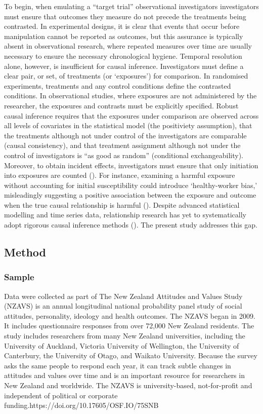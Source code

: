 \documentclass[
  singlecolumn]{article}
\begin{document}
To begin, when emulating a ``target trial'' observational investigators
investigators must ensure that outcomes they measure do not precede the
treatments being contrasted. In experimental designs, it is clear that
events that occur before manipulation cannot be reported as outcomes,
but this assurance is typically absent in observational research, where
repeated measures over time are usually necessary to ensure the
necessary chronological hygiene. Temporal resolution alone, however, is
insufficient for causal inference. Investigators must define a clear
pair, or set, of treatments (or `exposures') for comparison. In
randomised experiments, treatments and any control conditions define the
contrasted conditions. In observational studies, where exposures are not
administered by the researcher, the exposures and contrasts must be
explicitly specified. Robust causal inference requires that the
exposures under comparison are observed across all levels of covariates
in the statistical model (the positiviety assumption), that the
treatments although not under control of the investigators are
comparable (causal consistency), and that treatment assignment although
not under the control of investigators is ``as good as random''
(conditional exchangeability). Moreover, to obtain incident effects,
investigators must ensure that only initiation into exposures are
counted (). For
instance, examining a harmful exposure without accounting for initial
susceptibility could introduce `healthy-worker bias,' misleadingly
suggesting a positive association between the exposure and outcome when
the true causal relationship is harmful
(). Despite advanced statistical
modelling and time series data, relationship research has yet to
systematically adopt rigorous causal inference methods
(). The present
study addresses this gap.

\subsection{Method}\label{method}

\subsubsection{Sample}\label{sample}

Data were collected as part of The New Zealand Attitudes and Values
Study (NZAVS) is an annual longitudinal national probability panel study
of social attitudes, personality, ideology and health outcomes. The
NZAVS began in 2009. It includes questionnaire responses from over
72,000 New Zealand residents. The study includes researchers from many
New Zealand universities, including the University of Auckland, Victoria
University of Wellington, the University of Canterbury, the University
of Otago, and Waikato University. Because the survey asks the same
people to respond each year, it can track subtle changes in attitudes
and values over time and is an important resource for researchers in New
Zealand and worldwide. The NZAVS is university-based, not-for-profit and
independent of political or corporate
funding.https://doi.org/10.17605/OSF.IO/75SNB
\end{document}
